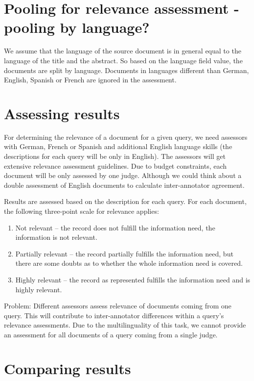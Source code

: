 \documentclass[a4paper,11pt]{article}
\begin{document}
\section{Pooling for relevance assessment - pooling by language?}

We assume that the language of the source document is in general equal to the language of the title and the abstract. So based on the language field value, the documents are split by language.
Documents in languages different than German, English, Spanish or French are ignored in the assessment. 

\section{Assessing results}

For determining the relevance of a document for a given query, we need assessors with German, French or Spanish and additional English language skills (the descriptions for each query will be only in English). The assessors will get extensive relevance assessment guidelines. Due to budget constraints, each document will be only assessed by one judge. Although we could think about a double assessment of English documents to calculate inter-annotator agreement.

Results are assessed based on the description for each query. For each document, the following three-point scale for relevance applies:
\begin{enumerate}
\item Not relevant – the record does not fulfill the information need, the information is not relevant.
\item Partially relevant – the record partially fulfills the information need, but there are some doubts as to
whether the whole information need is covered.
\item Highly relevant – the record as represented fulfills the information need and is highly relevant.
\end{enumerate}

Problem: Different assessors assess relevance of documents coming from one query. This will contribute to inter-annotator differences within a query’s relevance assessments. Due to the multilinguality of this task, we cannot provide an assessment for all documents of a query coming from a single judge.

\section{Comparing results}
\end{document}
